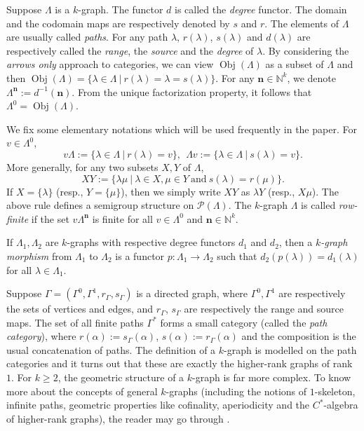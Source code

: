 \documentclass[a4paper,reqno,11pt]{amsart}
\numberwithin{equation}{section}
\theoremstyle{definition}
\theoremstyle{remark}
\newcommand{\Obj}{\operatorname{Obj}}
\newcommand{\N}{\mathbf{n}}
\begin{document}
Suppose $\Lambda$ is a $k$-graph. The functor $d$ is called the \emph{degree} functor. The domain and the codomain maps are respectively denoted by $s$ and $r$. The elements of $\Lambda$ are usually called \emph{paths}. For any path $\lambda$, $r(\lambda)$, $s(\lambda)$ and $d(\lambda)$ are respectively called the \emph{range}, the \emph{source} and the \emph{degree} of $\lambda$. By considering the \emph{arrows only} approach to categories, we can view $\Obj(\Lambda)$ as a subset of $\Lambda$ and then $\Obj(\Lambda)=\{\lambda\in \Lambda~|~r(\lambda)=\lambda=s(\lambda)\}$. For any $\N\in \mathbb{N}^k$, we denote $\Lambda^\N:=d^{-1}(\N)$. From the unique factorization property, it follows that $\Lambda^0=\Obj(\Lambda)$. 

We fix some elementary notations which will be used frequently in the paper. For $v\in \Lambda^0$, \[v\Lambda:=\{\lambda\in \Lambda~|~r(\lambda)=v\},~~\Lambda v:=\{\lambda\in \Lambda~|~s(\lambda)=v\}.\] More generally, for any two subsets $X,Y$ of $\Lambda$, \[XY:=\{\lambda\mu~|~\lambda\in X,\mu\in Y~\text{and}~s(\lambda)=r(\mu)\}.\] If $X=\{\lambda\}$ (resp., $Y=\{\mu\}$), then we simply write $XY$ as $\lambda Y$ (resp., $X\mu$). The above rule defines a semigroup structure on $\mathcal{P}(\Lambda)$. The $k$-graph $\Lambda$ is called \emph{row-finite} if the set $v\Lambda^\N$ is finite for all $v\in \Lambda^0$ and $\N\in \mathbb{N}^k$.

If $\Lambda_1,\Lambda_2$ are $k$-graphs with respective degree functors $d_1$ and $d_2$, then a \emph{$k$-graph morphism} from $\Lambda_1$ to $\Lambda_2$ is a functor $p:\Lambda_1\longrightarrow \Lambda_2$ such that $d_2(p(\lambda))=d_1(\lambda)$ for all $\lambda\in \Lambda_1$. 

Suppose $\Gamma=(\Gamma^0,\Gamma^1,r_\Gamma,s_\Gamma)$ is a directed graph, where $\Gamma^0,\Gamma^1$ are respectively the sets of vertices and edges, and $r_\Gamma$, $s_\Gamma$ are respectively the range and source maps. The set of all finite paths $\Gamma^*$ forms a small category (called the \emph{path category}), where $r(\alpha):=s_\Gamma(\alpha)$, $s(\alpha):=r_\Gamma(\alpha)$ and the composition is the usual concatenation of paths. The definition of a $k$-graph is modelled on the path categories and it turns out that these are exactly the higher-rank graphs of rank $1$. For $k\ge 2$, the geometric structure of a $k$-graph is far more complex. To know more about the concepts of general $k$-graphs (including the notions of $1$-skeleton, infinite paths, geometric properties like cofinality, aperiodicity and the $C^*$-algebra of higher-rank graphs), the reader may go through \cite{kNotes}. 
\end{document}
